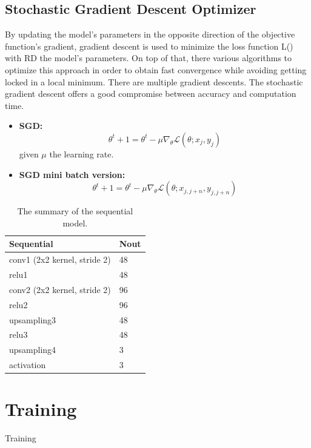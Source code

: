 \documentclass{article}
\begin{document}
\begin{multicols}{2}
\begin{itemize}
\subsection{Stochastic Gradient Descent Optimizer}
By updating the model's parameters in the opposite direction of the objective function's gradient, gradient descent is used to minimize the loss function L() with RD the model's parameters. On top of that, there various algorithms to optimize this approach in order to obtain fast convergence while avoiding getting locked in a local minimum. There are multiple gradient descents. The stochastic gradient descent offers a good compromise between accuracy and computation time.
\begin{itemize}
\item \textbf{SGD:} $$\theta^t+1 = \theta^{t} - \mu \nabla_\theta \mathcal{L}(\theta;x_j , y_j)$$ given $\mu$ the learning rate.
\item \textbf{SGD mini batch version:}
$$\theta^t+1 = \theta^{t} - \mu \nabla_\theta \mathcal{L}(\theta;x_{j,j+n} , y_{j,j+n})$$
\end{itemize}


\begin{table}[H]
    \centering
        \begin{tabular}{|l|l|}
        \hline
        \textbf{Sequential} & \textbf{Nout} \\ \hline
        conv1 (2x2 kernel, stride 2) & 48            \\ \hline
        relu1               & 48              \\ \hline
        conv2 (2x2 kernel, stride 2) & 96            \\ \hline
        relu2               &  96             \\ \hline
        upsampling3         & 48            \\ \hline
        relu3               &  48             \\ \hline
        upsampling4         & 3             \\ \hline
        activation          &  3             \\ \hline
    \end{tabular}
    \caption{The summary of the sequential model.}
    \label{tab:seq}
\end{table}

\section{Training}
Training


\end{itemize}
\end{multicols}
\end{document}
